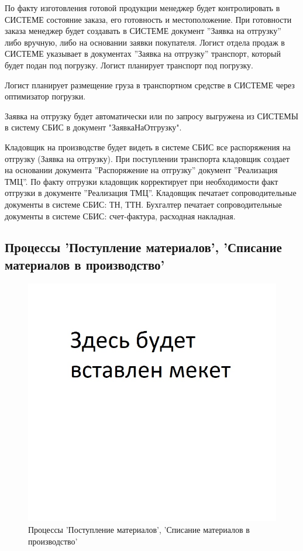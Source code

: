 По факту изготовления готовой продукции менеджер будет контролировать в СИСТЕМЕ состояние заказа, его готовность и местоположение.
При готовности заказа менеджер будет создавать в СИСТЕМЕ документ ''Заявка на отгрузку'' либо вручную, либо на основании заявки покупателя.
Логист отдела продаж в СИСТЕМЕ указывает в документах ''Заявка на отгрузку'' транспорт, который будет подан под погрузку. Логист планирует транспорт под погрузку.

Логист планирует размещение груза в транспортном средстве в СИСТЕМЕ через оптимизатор погрузки.

Заявка на отгрузку будет автоматически или по запросу выгружена из СИСТЕМЫ в систему СБИС в документ "ЗаявкаНаОтгрузку".

Кладовщик на производстве будет видеть в системе СБИС все распоряжения на отгрузку (Заявка на отгрузку).
При поступлении транспорта кладовщик создает на основании документа ''Распоряжение на отгрузку'' документ ''Реализация ТМЦ''. По факту отгрузки кладовщик корректирует при необходимости факт отгрузки в документе ''Реализация ТМЦ''. 
Кладовщик печатает сопроводительные документы в системе СБИС: ТН, ТТН.
Бухгалтер печатает сопроводительные документы в системе СБИС: счет-фактура, расходная накладная.



\subsection{Процессы 'Поступление материалов', 'Списание материалов в производство'}
%
\begin{figure}
\begin{center}
  \includegraphics[angle=90, height=0.8\textheight, keepaspectratio]{Pics/Pattern.jpg}
\end{center}
  \caption{Процессы 'Поступление материалов', 'Списание материалов в производство'}
  \label{pic:Schema_6}
\end{figure}

